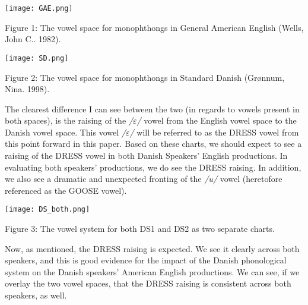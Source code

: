     
   
    
    \bigskip

    \begin{figure1}
    \centering    
    \texttt{[image: GAE.png]}
   
    \caption{Figure 1: The vowel space for monophthongs in General American English (Wells,  John  C..  1982).}
    \par
    \end{figure1}

    \bigskip 
    
     \bigskip

    \begin{figure2}
    \centering    
    \texttt{[image: SD.png]}
   
    \caption{Figure 2: The vowel space for monophthongs in Standard Danish (Grønnum, Nina. 1998).}
    \par
    \end{figure2}

    \bigskip 
    
    The clearest difference I can see between the two (in regards to vowels present in both spaces), is the raising of the \emph{/$\varepsilon$/} vowel from the English vowel space to the Danish vowel space. This vowel \emph{/$\varepsilon$/} will be referred to as the DRESS vowel from this point forward in this paper. Based on these charts, we should expect to see a raising of the DRESS vowel in both Danish Speakers' English productions. In evaluating both speakers' productions, we do see the DRESS raising. In addition, we also see a dramatic and unexpected fronting of the \emph{/u/} vowel (heretofore referenced as the GOOSE vowel). 
    
       \bigskip

    \begin{figure3}
    \centering    
    \texttt{[image: DS\_both.png]}
   
    \caption{Figure 3: The vowel system for both DS1 and DS2 as two separate charts.}
    \par
    \end{figure3}

    \bigskip 
    
    Now, as mentioned, the DRESS raising is expected. We see it clearly across both speakers, and this is good evidence for the impact of the Danish phonological system on the Danish speakers' American English productions. We can see, if we overlay the two vowel spaces, that the DRESS raising is consistent across both speakers, as well.
    
